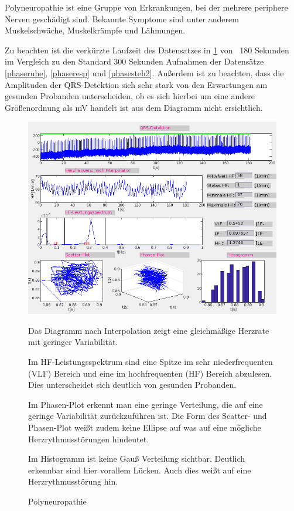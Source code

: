 \documentclass[a4paper,12pt,titlepage]{scrartcl}
\begin{document}
Polyneuropathie ist eine Gruppe von Erkrankungen, bei der mehrere periphere Nerven geschädigt sind. Bekannte Symptome sind unter anderem Muskelschwäche, Muskelkrämpfe und Lähmungen.

Zu beachten ist die verkürzte Laufzeit des Datensatzes in \ref{zwickau} von ~180 Sekunden im Vergleich zu den Standard 300 Sekunden Aufnahmen der Datensätze \ref{phaseruhe}, \ref{phaseresp} und \ref{phasesteh2}. Außerdem ist zu beachten, dass die Amplituden der QRS-Detektion sich sehr stark von den Erwartungen am gesunden Probanden unterscheiden, ob es sich hierbei um eine andere Größenordnung als mV handelt ist aus dem Diagramm nicht ersichtlich.

\begin{figure}[ht]
    \begin{minipage}[t]{0.5\linewidth}
        \centering
        \includegraphics[width=0.9\linewidth, valign=t]{Assets/LaborBMT-17-30-09.png}
        \caption{Polyneuropathie}
        \label{zwickau}
    \end{minipage}%
    \begin{minipage}[t]{0.5\linewidth}
        Das Diagramm nach Interpolation zeigt eine gleichmäßige Herzrate mit geringer Variabilität.

        Im HF-Leistungsspektrum sind eine Spitze im sehr niederfrequenten (VLF) Bereich und eine im hochfrequenten (HF) Bereich abzulesen. Dies unterscheidet sich deutlich von gesunden Probanden.

        Im Phasen-Plot erkennt man eine geringe Verteilung, die auf eine geringe Variabilität zurückzuführen ist. Die Form des Scatter- und Phasen-Plot weißt zudem keine Ellipse auf was auf eine mögliche Herzrythmusstörungen hindeutet.

        Im Histogramm ist keine Gauß Verteilung sichtbar. Deutlich erkennbar sind hier vorallem Lücken. Auch dies weißt auf eine Herzrythmusstörung hin.

    \end{minipage}
\end{figure}
\end{document}
